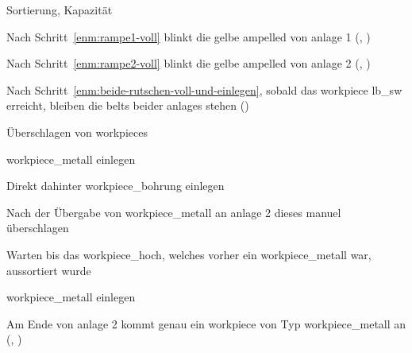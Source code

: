 \begin{abntest}{Sortierung, Kapazität}
    \begin{erwartung}
        \item Nach Schritt~\ref{enm:rampe1-voll} blinkt die gelbe \gls{ampelled}
        von \gls{anlage} 1 (, ) %
        \item Nach Schritt~\ref{enm:rampe2-voll} blinkt die gelbe \gls{ampelled}
        von \gls{anlage} 2 (, ) %
        \item Nach Schritt~\ref{enm:beide-rutschen-voll-und-einlegen}, sobald das \gls{workpiece}
        \gls{lb_sw} erreicht, bleiben die \glspl{belt} beider \glspl{anlage} stehen ()
    \end{erwartung}

    \begin{ablauf}{Überschlagen von \glspl{workpiece}}
        \item \gls{workpiece_metall} einlegen
        \item Direkt dahinter \gls{workpiece_bohrung} einlegen
        \item Nach der Übergabe von \gls{workpiece_metall} an \gls{anlage} 2 dieses manuel überschlagen
        \item Warten bis das \gls{workpiece_hoch}, welches vorher ein \gls{workpiece_metall} war,
        aussortiert wurde
        \item \gls{workpiece_metall} einlegen
    \end{ablauf}

    \erwartungText
    Am Ende von \gls{anlage} 2 kommt genau ein \gls{workpiece} von Typ \gls{workpiece_metall} an (, )

\end{abntest}
